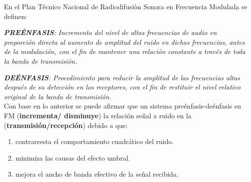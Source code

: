 \begin{enumerate}
En el Plan Técnico Nacional de Radiodifusiòn Sonora en Frecuencia Modulada se definen:

\textit{\textbf{PREÉNFASIS}: Incremento del nivel de altas frecuencias de audio en proporción directa al aumento de amplitud del ruido en dichas frecuencias, antes de la modulación, con el fin de mantener una relación constante a través de toda la banda de transmisión.}

\textit{\textbf{DEÉNFASIS}: Procedimiento para reducir la amplitud de las frecuencias altas después de su detección en los receptores, con el fin de restituir el nivel relativo original de la banda de transmisión.}\\

Con base en lo anterior se puede afirmar que un sistema preénfasis-deénfasis en FM (\textbf{incrementa/
	disminuye}) la relación señal a ruido en la (\textbf{transmisión/recepción}) debido a que:
\begin{enumerate}
	\item contrarresta el comportamiento cuadrático del ruido.
	\item minimiza las causas del efecto umbral.	
	\item mejora el ancho de banda efectivo de la señal recibida.
\end{enumerate}
\end{enumerate}

